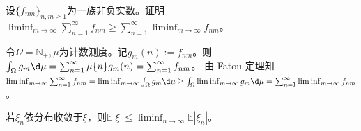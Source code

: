 \documentclass{ctexart}
\begin{document}
\begin{problem}\label{pro:3.6.7}
  设\(\{f_{nm}\}_{n,m \geq 1} \)为一族非负实数。证明\(\liminf_{m \to \infty} \sum_{n = 1}^{\infty}f_{nm} \geq \sum_{n = 1}^{\infty}\liminf_{m \to \infty}f_{nm} \)。
\end{problem}

\begin{solution}
  令\(\Omega=\mathbb{N}_{+},\mu \)为计数测度。记\(g_m(n):=f_{nm} \)。则\(\int_{\Omega} g_m \d \mu =\sum_{n=1}^{\infty} \mu\{n\} g_m(n)=\sum_{n=1}^{\infty}f_{nm} \)。
  由 Fatou 定理知\(\liminf_{m \to \infty} \sum_{n = 1}^{\infty}f_{nm} =\liminf_{m \to \infty} \int_{\Omega} g_m \d \mu \geq \int_{\Omega} \liminf_{m \to \infty} g_m \d \mu =\sum_{n = 1}^{\infty}\liminf_{m \to \infty}f_{nm} \)。
\end{solution}

\begin{problem}\label{pro:3.6.10}
  若\(\xi_n \)依分布收敛于\(\xi \)，则\(\mathbb{E} |\xi| \leq \liminf_{n \to \infty}\mathbb{E} |\xi_n| \)。
\end{problem}
\end{document}
